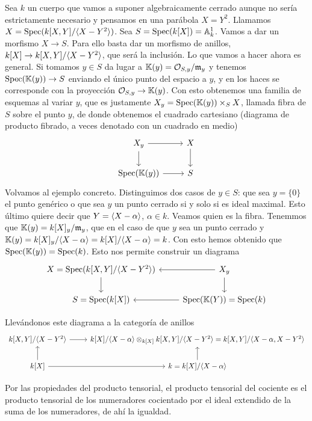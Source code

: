 \documentclass[GA.tex]{subfiles}
\begin{document}
\begin{ej}
Sea $k$ un cuerpo que vamos a suponer algebraicamente cerrado aunque no sería estrictamente necesario y pensamos en una parábola $X=Y^2$. Llamamos $X=\operatorname{Spec}(k[X,Y]/\langle{X-Y^2}\rangle)$. Sea $S=\operatorname{Spec}(k[X])=\mathbb{A}_k^1$. Vamos a dar un morfismo $X\to S$. Para ello basta dar un morfismo de anillos, $k[X]\to k[X,Y]/\langle{X-Y^2}\rangle$, que será la inclusión. Lo que vamos a hacer ahora es general. Si tomamos $y\in S$ da lugar a $\mathbb{K}(y)={\mathcal O}_{S,y}/{\mathfrak{m}}_y$ y tenemos $\operatorname{Spec}(\mathbb{K}(y))\to S$ enviando el único punto del espacio a $y$, y en los haces se corresponde con la proyección ${\mathcal O}_{S,y}\to \mathbb{K}(y)$. Con esto obtenemos una familia de esquemas al variar $y$, que es justamente $X_y=\operatorname{Spec}(\mathbb{K}(y))\times_S X$, llamada fibra de $S$ sobre el punto $y$, de donde obtenemos el cuadrado cartesiano (diagrama de producto fibrado, a veces denotado con un cuadrado en medio)
\[
\begin{tikzcd}
X_y\arrow[r]\arrow[d] & X\arrow[d]\\
\spec(\K(y))\arrow[r] & S
\end{tikzcd}
\]
Volvamos al ejemplo concreto. Distinguimos dos casos de $y\in S$: que sea $y=\{0\}$ el punto genérico o que sea $y$ un punto cerrado si y solo si es ideal maximal. Esto último quiere decir que $Y=\langle{X-\alpha}\rangle$, $\alpha\in k$. Veamos quien es la fibra. Tenemmos que $\mathbb{K}(y)=k[X]_y/{\mathfrak{m}}_y$, que en el caso de que $y$ sea un punto cerrado y $\mathbb{K}(y)=k[X]_y/\langle{X-\alpha}\rangle=k[X]/\langle{X-\alpha}\rangle=k$. Con esto hemos obtenido que $\operatorname{Spec}(\mathbb{K}(y))=\operatorname{Spec}(k)$. Esto nos permite construir un diagrama
\[
\begin{tikzcd}
X=\spec(k[X,Y]/\gene{X-Y^2})\arrow[d] & X_y\arrow[d]\arrow[l]\\
S=\spec(k[X])& \spec(\K(Y))=\spec(k)\arrow[l]
\end{tikzcd}
\]

Llevándonos este diagrama a la categoría de anillos 
\[
\begin{tikzcd}
k[X,Y]/\gene{X-Y^2}\arrow[r] & k[X]/\gene{X-\alpha}\otimes_{k[X]}k[X,Y]/\gene{X-Y^2}=k[X,Y]/\gene{X-\alpha,X-Y^2}\\
k[X]\arrow[u]\arrow[r] & k=k[X]/\gene{X-\alpha}\arrow[u]
\end{tikzcd}
\]

Por las propiedades del producto tensorial, el producto tensorial del cociente es el producto tensorial de los numeradores cocientado por el ideal extendido de la suma de los numeradores, de ahí la igualdad.


\end{ej}
\end{document}
